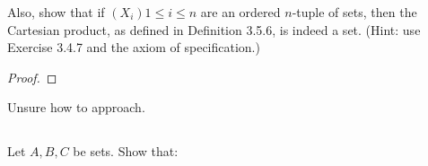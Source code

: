 \documentclass[../../main.tex]{subfiles}
\begin{document}
\begin{q}
    Also, show that if $(X_i){1 \leq i \leq n}$ are an ordered $n$-tuple of sets, then the Cartesian product, as defined in Definition 3.5.6, is indeed a set. (Hint: use Exercise 3.4.7 and the axiom of specification.)
\end{q}

\begin{proof}

\end{proof}
\begin{xx}
    Unsure how to approach.
\end{xx}

\addtocounter{subsection}{1}
\subsection{}
\begin{q}
    Let $A, B, C$ be sets. Show that: 
\end{q}
\end{document}

